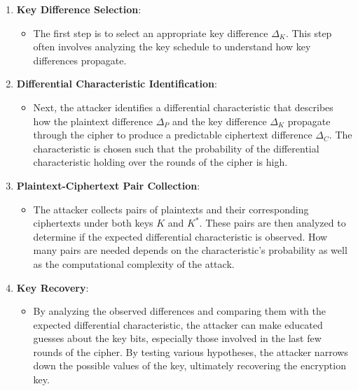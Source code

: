 \begin{enumerate}
    \item \textbf{Key Difference Selection}:
    \begin{itemize}
        \item The first step is to select an appropriate key difference $\Delta_K$. This step often involves analyzing the key schedule to understand how key differences propagate.
    \end{itemize}
    
    \item \textbf{Differential Characteristic Identification}:
    \begin{itemize}
        \item Next, the attacker identifies a differential characteristic that describes how the plaintext difference $\Delta_P$ and the key difference $\Delta_K$ propagate through the cipher to produce a predictable ciphertext difference $\Delta_C$. The characteristic is chosen such that the probability of the differential characteristic holding over the rounds of the cipher is high.
    \end{itemize}
    
    \item \textbf{Plaintext-Ciphertext Pair Collection}:
    \begin{itemize}
        \item The attacker collects pairs of plaintexts and their corresponding ciphertexts under both keys $K$ and $K^*$. These pairs are then analyzed to determine if the expected differential characteristic is observed. How many pairs are needed depends on the characteristic’s probability as well as the computational complexity of the attack.
    \end{itemize}
    
    \item \textbf{Key Recovery}:
    \begin{itemize}
        \item By analyzing the observed differences and comparing them with the expected differential characteristic, the attacker can make educated guesses about the key bits, especially those involved in the last few rounds of the cipher. By testing various hypotheses, the attacker narrows down the possible values of the key, ultimately recovering the encryption key.
    \end{itemize}
\end{enumerate}






